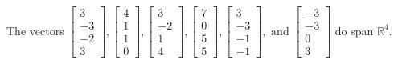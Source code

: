 \begin{exercise}
\begin{exerciseStatement}
  \end{exerciseStatement}
  \begin{exerciseAnswer}
   The vectors \(\left[\begin{array}{r}
3 \\
-3 \\
-2 \\
3
\end{array}\right] , \left[\begin{array}{r}
4 \\
1 \\
1 \\
0
\end{array}\right] , \left[\begin{array}{r}
3 \\
-2 \\
1 \\
4
\end{array}\right] , \left[\begin{array}{r}
7 \\
0 \\
5 \\
5
\end{array}\right] , \left[\begin{array}{r}
3 \\
-3 \\
-1 \\
-1
\end{array}\right] , \text{ and } \left[\begin{array}{r}
-3 \\
-3 \\
0 \\
3
\end{array}\right]\) 
  	 do  
	span \(\mathbb{R}^4\).
  


  \end{exerciseAnswer}
\end{exercise}